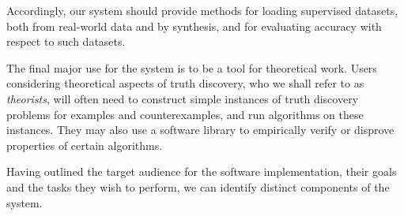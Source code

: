 \documentclass[../main.tex]{subfiles}
\begin{document}

Accordingly, our system should provide methods for loading supervised
datasets, both from real-world data and by synthesis, and for evaluating
accuracy with respect to such datasets.

The final major use for the system is to be a tool for theoretical work. Users
considering theoretical aspects of truth discovery, who we shall refer to as
\emph{theorists}, will often need to construct simple instances of truth
discovery problems for examples and counterexamples, and run algorithms on
these instances. They may also use a software library to empirically verify or
disprove properties of certain algorithms.

Having outlined the target audience for the software implementation, their
goals and the tasks they wish to perform, we can identify distinct components
of the system.

\end{document}

